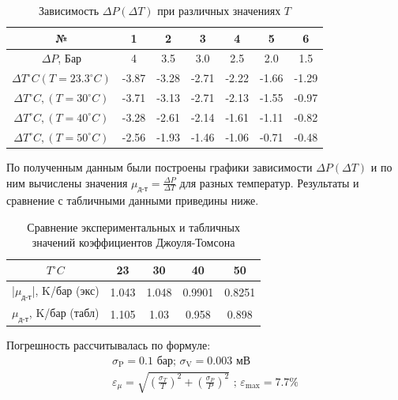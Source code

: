 \begin{table}[h!]
    \centering
    \begin{tabular}{|c|c|c|c|c|c|c|}
    \hline
        № & 1 & 2 & 3 & 4 & 5 & 6 \\\hline
        $\Delta P$, Бар  & 4 & 3.5 & 3.0 & 2.5 & 2.0 & 1.5 \\\hline
        $\Delta T^\circ C (T = 23.3^\circ C)$ & -3.87 & -3.28 & -2.71 & -2.22 & -1.66 & -1.29 \\\hline
        $\Delta T^\circ C, (T = 30^\circ C)$ & -3.71 & -3.13 & -2.71 & -2.13 & -1.55 & -0.97 \\\hline 
        $\Delta T^\circ C, (T = 40^\circ C)$ & -3.28 & -2.61 & -2.14 & -1.61 & -1.11 & -0.82\\\hline 
        $\Delta T^\circ C, (T = 50^\circ C)$ & -2.56 & -1.93 & -1.46 & -1.06 & -0.71 & -0.48\\\hline
    \end{tabular}
    \caption{Зависимость $\Delta P(\Delta T)$ при различных значениях $T$}
\end{table}

\indent
По полученным данным были построены графики зависимости $\Delta P(\Delta T)$ и 
по ним вычислены значения $\mu_{\text{д-т}} = \frac{\Delta P}{\Delta T}$ для 
разных температур. Результаты и сравнение с табличными данными приведины ниже.\\ 

\begin{table}[h!]
    \centering
    \begin{tabular}{|c|c|c|c|c|}
        \hline
        $T^{\circ} C$ & 23 & 30 & 40 & 50\\\hline 
        |$\mu_{\text{д-т}}$|, K/бар (экс) & 1.043 & 1.048 & 0.9901 & 0.8251\\\hline
        $\mu_{\text{д-т}}$, K/бар (табл) & 1.105 & 1.03 & 0.958 & 0.898\\\hline 
    \end{tabular}
    \caption{Сравнение экспериментальных и табличных значений коэффициентов Джоуля-Томсона}
\end{table}
Погрешность рассчитывалась по формуле:
\begin{align}
    \sigma_{\text{P}} = 0.1 \text{ бар; } \sigma_{\text{V}} = 0.003 \text{ мВ}\\ 
    \varepsilon_{\mu} = \sqrt{\left (\frac{\sigma_{T}}{T}\right )^2 + \left (\frac{\sigma_{P}}{P}\right )^2}\text{ ; }\varepsilon_{\text{max}}=7.7\%
\end{align}

